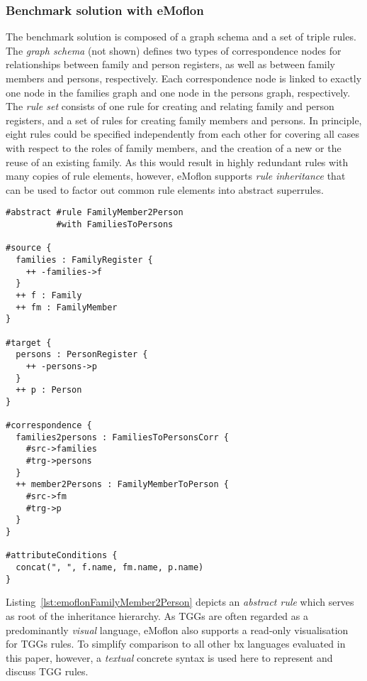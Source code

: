 \subsubsection{Benchmark solution with eMoflon}
\label{sec:solutionEMoflon}


The benchmark solution is composed of a graph schema and a set of triple rules.
The \emph{graph schema} (not shown) defines two types of correspondence nodes for relationships between family and person registers, as well as between family members and persons, respectively. Each correspondence node is linked to exactly one node in the families graph and one node in the persons graph, respectively.
%
The \emph{rule set} consists of one rule for creating and relating family and person registers, and a set of rules for creating family members and persons.
In principle, eight rules could be specified independently from each other for covering all cases with respect to the roles of family members, and the creation of a new or the reuse of an existing family.
As this would result in highly redundant rules with many copies of rule elements, however, eMoflon supports \emph{rule inheritance} that can be used to factor out common rule elements into abstract superrules. 

\begin{lstlisting}[label={lst:emoflonFamilyMember2Person}, float=bt!, language=emoflon, caption={Mapping family members to persons}]
#abstract #rule FamilyMember2Person 
          #with FamiliesToPersons

#source { 
  families : FamilyRegister {
    ++ -families->f
  }
  ++ f : Family
  ++ fm : FamilyMember
}

#target {
  persons : PersonRegister {
    ++ -persons->p
  }
  ++ p : Person
}

#correspondence {
  families2persons : FamiliesToPersonsCorr {
    #src->families
    #trg->persons
  }
  ++ member2Persons : FamilyMemberToPerson {
    #src->fm
    #trg->p
  }
}

#attributeConditions {
  concat(", ", f.name, fm.name, p.name)
}
\end{lstlisting}


Listing~\ref{lst:emoflonFamilyMember2Person} depicts an \emph{abstract rule} which serves as root of the inheritance hierarchy.
As TGGs are often regarded as a predominantly \emph{visual} language, eMoflon also supports a read-only visualisation for TGGs rules.  
To simplify comparison to all other bx languages evaluated in this paper, however, a \emph{textual} concrete syntax is used here to represent and discuss TGG rules.

